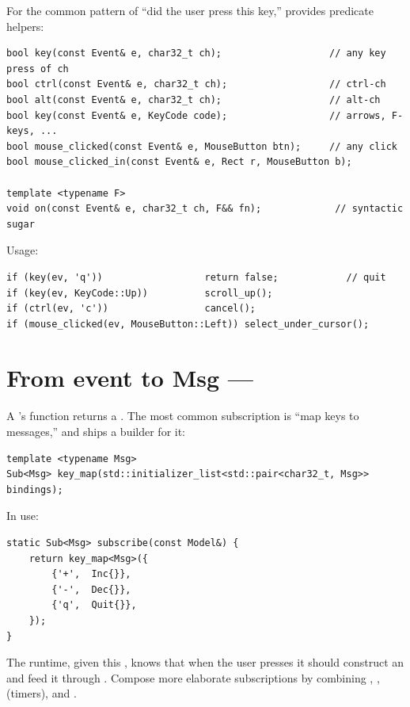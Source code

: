 For the common pattern of ``did the user press this key,'' \maya{}
provides predicate helpers:

\begin{lstlisting}
bool key(const Event& e, char32_t ch);                   // any key press of ch
bool ctrl(const Event& e, char32_t ch);                  // ctrl-ch
bool alt(const Event& e, char32_t ch);                   // alt-ch
bool key(const Event& e, KeyCode code);                  // arrows, F-keys, ...
bool mouse_clicked(const Event& e, MouseButton btn);     // any click
bool mouse_clicked_in(const Event& e, Rect r, MouseButton b);

template <typename F>
void on(const Event& e, char32_t ch, F&& fn);             // syntactic sugar
\end{lstlisting}

Usage:

\begin{lstlisting}
if (key(ev, 'q'))                  return false;            // quit
if (key(ev, KeyCode::Up))          scroll_up();
if (ctrl(ev, 'c'))                 cancel();
if (mouse_clicked(ev, MouseButton::Left)) select_under_cursor();
\end{lstlisting}

\section{From event to Msg --- }

A 's  function returns a .
The most common subscription is ``map keys to messages,'' and
\maya{} ships a builder for it:

\begin{lstlisting}
template <typename Msg>
Sub<Msg> key_map(std::initializer_list<std::pair<char32_t, Msg>> bindings);
\end{lstlisting}

In use:

\begin{lstlisting}
static Sub<Msg> subscribe(const Model&) {
    return key_map<Msg>({
        {'+',  Inc{}},
        {'-',  Dec{}},
        {'q',  Quit{}},
    });
}
\end{lstlisting}

The runtime, given this , knows that when the user
presses \code{+} it should construct an  
and feed it through . Compose more elaborate
subscriptions by combining , ,
 (timers), and .

